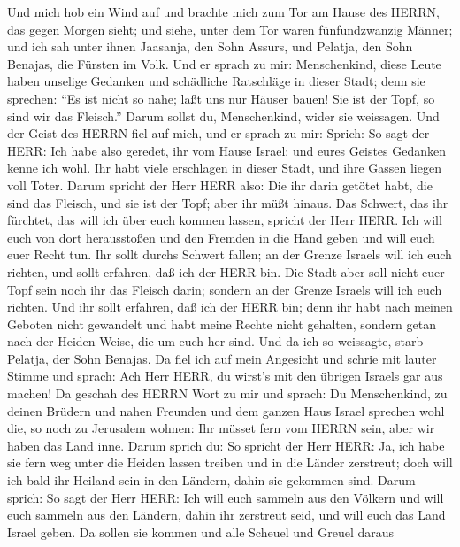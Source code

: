  Und mich hob ein Wind auf und brachte mich zum Tor am Hause
des HERRN, das gegen Morgen sieht; und siehe, unter dem Tor waren
fünfundzwanzig Männer; und ich sah unter ihnen Jaasanja, den Sohn
Assurs, und Pelatja, den Sohn Benajas, die Fürsten im Volk. 
Und er sprach zu mir: Menschenkind, diese Leute haben unselige Gedanken
und schädliche Ratschläge in dieser Stadt;  denn sie
sprechen: ``Es ist nicht so nahe; laßt uns nur Häuser bauen! Sie ist der
Topf, so sind wir das Fleisch.''  Darum sollst du,
Menschenkind, wider sie weissagen.  Und der Geist des HERRN
fiel auf mich, und er sprach zu mir: Sprich: So sagt der HERR: Ich habe
also geredet, ihr vom Hause Israel; und eures Geistes Gedanken kenne ich
wohl.  Ihr habt viele erschlagen in dieser Stadt, und ihre
Gassen liegen voll Toter.  Darum spricht der Herr HERR also:
Die ihr darin getötet habt, die sind das Fleisch, und sie ist der Topf;
aber ihr müßt hinaus.  Das Schwert, das ihr fürchtet, das
will ich über euch kommen lassen, spricht der Herr HERR. 
Ich will euch von dort herausstoßen und den Fremden in die Hand geben
und will euch euer Recht tun.  Ihr sollt durchs Schwert
fallen; an der Grenze Israels will ich euch richten, und sollt erfahren,
daß ich der HERR bin.  Die Stadt aber soll nicht euer Topf
sein noch ihr das Fleisch darin; sondern an der Grenze Israels will ich
euch richten.  Und ihr sollt erfahren, daß ich der HERR
bin; denn ihr habt nach meinen Geboten nicht gewandelt und habt meine
Rechte nicht gehalten, sondern getan nach der Heiden Weise, die um euch
her sind.  Und da ich so weissagte, starb Pelatja, der Sohn
Benajas. Da fiel ich auf mein Angesicht und schrie mit lauter Stimme und
sprach: Ach Herr HERR, du wirst's mit den übrigen Israels gar aus
machen!  Da geschah des HERRN Wort zu mir und sprach:
 Du Menschenkind, zu deinen Brüdern und nahen Freunden und
dem ganzen Haus Israel sprechen wohl die, so noch zu Jerusalem wohnen:
Ihr müsset fern vom HERRN sein, aber wir haben das Land inne.
 Darum sprich du: So spricht der Herr HERR: Ja, ich habe
sie fern weg unter die Heiden lassen treiben und in die Länder
zerstreut; doch will ich bald ihr Heiland sein in den Ländern, dahin sie
gekommen sind.  Darum sprich: So sagt der Herr HERR: Ich
will euch sammeln aus den Völkern und will euch sammeln aus den Ländern,
dahin ihr zerstreut seid, und will euch das Land Israel geben.
 Da sollen sie kommen und alle Scheuel und Greuel daraus
